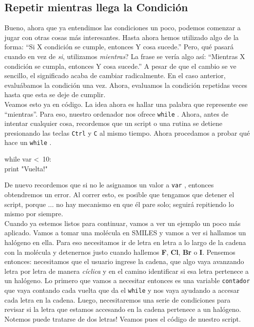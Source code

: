 \documentclass[10pt,letterpaper]{article}
\newcommand{\inlinecode}[1]{
\colorbox{light-gray}{\texttt{#1}}
}
\newenvironment{Code}
{
\begin{lrbox}{\selvestebox}%
\begin{minipage}{\dimexpr\columnwidth-2\fboxsep\relax}
\fontfamily{\ttdefault}\selectfont
}
{\end{minipage}\end{lrbox}%
\begin{center}
\colorbox{light-gray}{\usebox{\selvestebox}}
\end{center}
}
\begin{document}
\subsection{Repetir mientras llega la Condici\'on}
Bueno, ahora que ya entendimos las condiciones un poco, podemos comenzar a jugar con otras cosas m\'as interesantes. Hasta ahora hemos utilizado algo de la forma: ``Si X condici\'on se cumple, entonces Y cosa sucede.'' Pero, qu\'e pasar\'a cuando en vez de \emph{si}, utilizamos \emph{mientras}? La frase se ver\'ia algo as\'i: ``Mientras X condici\'on se cumpla, entonces Y cosa sucede.'' A pesar de que el cambio se ve sencillo, el significado acaba de cambiar radicalmente. En el caso anterior, evalu\'abamos la condici\'on una vez. Ahora, evaluamos la condici\'on repetidas veces hasta que esta se deje de cumplir.\\

Veamos esto ya en c\'odigo. La idea ahora es hallar una palabra que represente ese ``mientras''. Para eso, nuestro ordenador nos ofrece \inlinecode{while}. Ahora, antes de intentar cualquier cosa, recordemos que un script o una rutina se detiene presionando las teclas \inlinecode{Ctrl} y \inlinecode{C} al mismo tiempo. Ahora procedamos a probar qu\'e hace un \inlinecode{while}.

\begin{Code}
while var <\ 10:\\
\hspace*{5mm} print "Vuelta!"
\end{Code}

De nuevo recordemos que si no le asignamos un valor a \inlinecode{var}, entonces obtendremos un error. Al correr esto, es posible que tengamos que detener el script, porque ... no hay mecanismo en que \'el pare solo; seguir\'a repitiendo lo mismo por siempre.\\

Cuando ya estemos listos para continuar, vamos a ver un ejemplo un poco m\'as aplicado. Vamos a tomar una mol\'ecula en SMILES y vamos a ver si hallamos un hal\'ogeno en ella. Para eso necesitamos ir de letra en letra a lo largo de la cadena con la mol\'ecula y detenernos justo cuando hallemos \textbf{F}, \textbf{Cl}, \textbf{Br} o \textbf{I}. Pensemos entonces: necesitamos que el usuario ingrese la cadena, que algo vaya avanzando letra por letra de manera \emph{c\'iclica} y en el camino identificar si esa letra pertenece a un hal\'ogeno. Lo primero que vamos a necesitar entonces es una variable \inlinecode{contador} que vaya contando cada vuelta que da el \inlinecode{while} y nos vaya ayudando a accesar cada letra en la cadena. Luego, necesitaremos una serie de condiciones para revisar si la letra que estamos accesando en la cadena pertenece a un hal\'ogeno. Notemos puede tratarse de dos letras! Veamos pues el c\'odigo de nuestro script.
\end{document}
